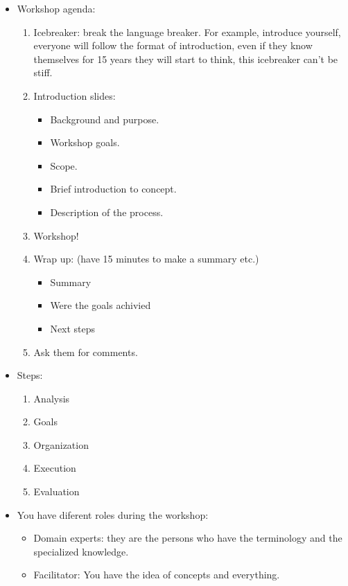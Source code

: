 \begin{itemize}
    \item Workshop agenda:
        \begin{enumerate}
            \item Icebreaker: break the language breaker. For example, introduce yourself, everyone will follow the format of introduction, even if they know themselves for 15 years they will start to think, this icebreaker can't be stiff.
            \item Introduction slides:
                \begin{itemize}
                    \item Background and purpose.
                    \item Workshop goals.
                    \item Scope.
                    \item Brief introduction to concept.
                    \item Description of the process.
                \end{itemize}
            \item Workshop! 
            \item Wrap up: (have 15 minutes to make a summary etc.)
                \begin{itemize}
                    \item Summary 
                    \item Were the goals achivied 
                    \item Next steps 
                \end{itemize}
            \item Ask them for comments.
        \end{enumerate} 
    
    \item Steps: 
        \begin{enumerate}
            \item Analysis 
            \item Goals 
            \item Organization 
            \item Execution 
            \item Evaluation 
        \end{enumerate}
    
    \item You have diferent roles during the workshop:
        \begin{itemize}
            \item Domain experts: they are the persons who have the terminology and the specialized knowledge.
            \item Facilitator: You have the idea of concepts and everything. 
        \end{itemize}
    

\end{itemize}
